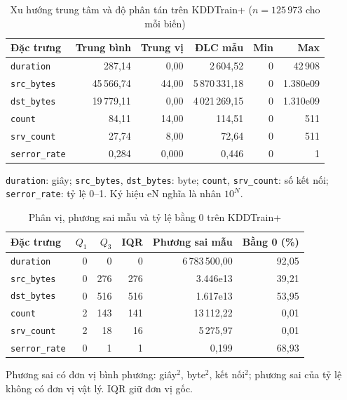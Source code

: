 \documentclass[../main.tex]{subfiles}
\begin{document}
\begin{table}[H]
\centering
\caption{Xu hướng trung tâm và độ phân tán trên KDDTrain+ ($n=125\,973$ cho mỗi biến)}
\label{tab:t2:descriptive}
\small
\setlength{\tabcolsep}{3pt}
\begin{tabular}{lrrrrr}
\toprule
Đặc trưng & Trung bình & Trung vị & ĐLC mẫu & Min & Max \\
\midrule
\texttt{duration} & 287,14 & 0,00 & 2\,604,52 & 0 & 42\,908 \\
\texttt{src\_bytes} & 45\,566,74 & 44,00 & 5\,870\,331,18 & 0 & 1.380e09 \\
\texttt{dst\_bytes} & 19\,779,11 & 0,00 & 4\,021\,269,15 & 0 & 1.310e09 \\
\texttt{count} & 84,11 & 14,00 & 114,51 & 0 & 511 \\
\texttt{srv\_count} & 27,74 & 8,00 & 72,64 & 0 & 511 \\
\texttt{serror\_rate} & 0,284 & 0,000 & 0,446 & 0 & 1 \\
\bottomrule
\end{tabular}
\par\smallskip\footnotesize \texttt{duration}: giây; \texttt{src\_bytes}, \texttt{dst\_bytes}: byte; \texttt{count}, \texttt{srv\_count}: số kết nối; \texttt{serror\_rate}: tỷ lệ 0--1. Ký hiệu eN nghĩa là nhân $10^N$.
\end{table}

\begin{table}[H]
\centering
\caption{Phân vị, phương sai mẫu và tỷ lệ bằng 0 trên KDDTrain+}
\label{tab:t2:quantiles}
\small
\setlength{\tabcolsep}{3pt}
\begin{tabular}{lrrrrr}
\toprule
Đặc trưng & $Q_1$ & $Q_3$ & IQR & Phương sai mẫu & Bằng 0 (\%) \\
\midrule
\texttt{duration} & 0 & 0 & 0 & 6\,783\,500,00 & 92,05 \\
\texttt{src\_bytes} & 0 & 276 & 276 & 3.446e13 & 39,21 \\
\texttt{dst\_bytes} & 0 & 516 & 516 & 1.617e13 & 53,95 \\
\texttt{count} & 2 & 143 & 141 & 13\,112,22 & 0,01 \\
\texttt{srv\_count} & 2 & 18 & 16 & 5\,275,97 & 0,01 \\
\texttt{serror\_rate} & 0 & 1 & 1 & 0,199 & 68,93 \\
\bottomrule
\end{tabular}
\par\smallskip\footnotesize Phương sai có đơn vị bình phương: giây$^2$, byte$^2$, kết nối$^2$; phương sai của tỷ lệ không có đơn vị vật lý. IQR giữ đơn vị gốc.
\end{table}
\end{document}

